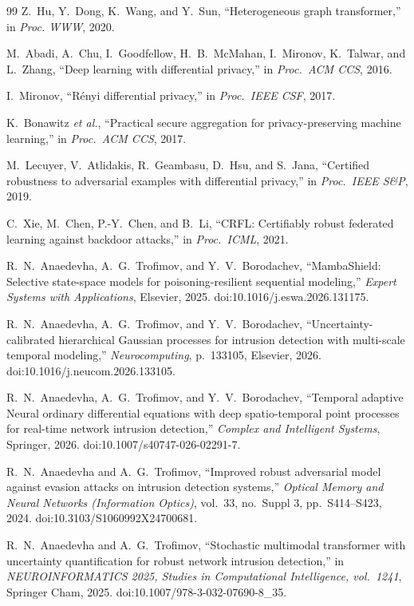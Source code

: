 \documentclass[12pt,a4paper]{article}
\theoremstyle{definition}
\theoremstyle{remark}
\begin{document}
\begin{thebibliography}{99}
Z.~Hu, Y.~Dong, K.~Wang, and Y.~Sun, ``Heterogeneous graph transformer,'' in \emph{Proc. WWW}, 2020.

M.~Abadi, A.~Chu, I.~Goodfellow, H.~B.~McMahan, I.~Mironov, K.~Talwar, and L.~Zhang, ``Deep learning with differential privacy,'' in \emph{Proc.\ ACM CCS}, 2016.

I.~Mironov, ``{R\'enyi} differential privacy,'' in \emph{Proc.\ IEEE CSF}, 2017.

K.~Bonawitz \emph{et al.}, ``Practical secure aggregation for privacy-preserving machine learning,'' in \emph{Proc.\ ACM CCS}, 2017.

M.~Lecuyer, V.~Atlidakis, R.~Geambasu, D.~Hsu, and S.~Jana, ``Certified robustness to adversarial examples with differential privacy,'' in \emph{Proc.\ IEEE S\&P}, 2019.

C.~Xie, M.~Chen, P.-Y.~Chen, and B.~Li, ``{CRFL}: Certifiably robust federated learning against backdoor attacks,'' in \emph{Proc.\ ICML}, 2021.

R.~N.~Anaedevha, A.~G.~Trofimov, and Y.~V.~Borodachev, ``{MambaShield}: Selective state-space models for poisoning-resilient sequential modeling,'' \emph{Expert Systems with Applications}, Elsevier, 2025. doi:10.1016/j.eswa.2026.131175.

R.~N.~Anaedevha, A.~G.~Trofimov, and Y.~V.~Borodachev, ``Uncertainty-calibrated hierarchical {Gaussian} processes for intrusion detection with multi-scale temporal modeling,'' \emph{Neurocomputing}, p.~133105, Elsevier, 2026. doi:10.1016/j.neucom.2026.133105.

R.~N.~Anaedevha, A.~G.~Trofimov, and Y.~V.~Borodachev, ``Temporal adaptive Neural ordinary differential equations with deep spatio-temporal point processes for real-time network intrusion detection,'' \emph{Complex and Intelligent Systems}, Springer, 2026. doi:10.1007/s40747-026-02291-7.

R.~N.~Anaedevha and A.~G.~Trofimov, ``Improved robust adversarial model against evasion attacks on intrusion detection systems,'' \emph{Optical Memory and Neural Networks (Information Optics)}, vol.~33, no.~Suppl 3, pp.~S414--S423, 2024. doi:10.3103/S1060992X24700681.

R.~N.~Anaedevha and A.~G.~Trofimov, ``Stochastic multimodal transformer with uncertainty quantification for robust network intrusion detection,'' in \emph{NEUROINFORMATICS 2025, Studies in Computational Intelligence, vol.~1241}, Springer Cham, 2025. doi:10.1007/978-3-032-07690-8\_35.


\end{thebibliography}
\end{document}
